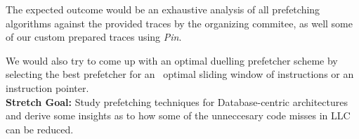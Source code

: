 
The expected outcome would be an exhaustive analysis of all prefetching algorithms against the provided
traces by the organizing commitee, as well some of our custom prepared traces using \textit{Pin}.

We would also try to come up with an optimal duelling prefetcher scheme by selecting the best prefetcher for an \
optimal sliding window of instructions or an instruction pointer. \\

\textbf{Stretch Goal:} Study prefetching techniques for Database-centric architectures 
\cite{asmdb} and derive some insights as to how some of the unneccesary code misses in LLC can be reduced.